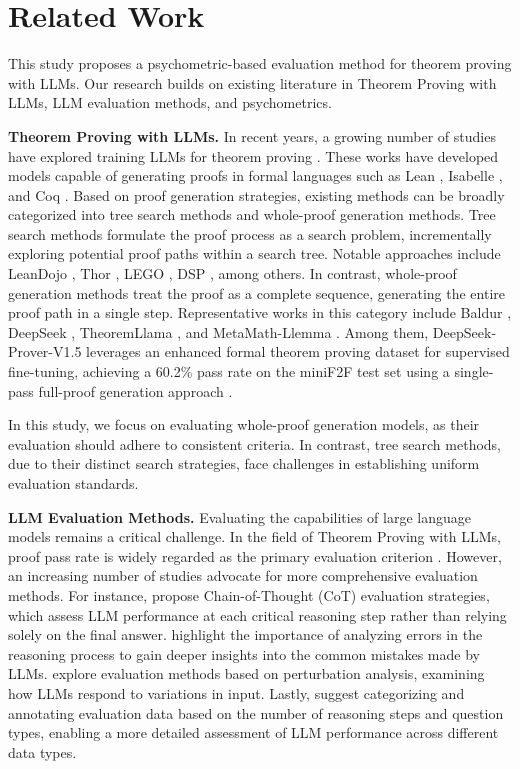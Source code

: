\section{Related Work}
\label{section-2}
This study proposes a psychometric-based evaluation method for theorem proving with LLMs. Our research builds on existing literature in Theorem Proving with LLMs, LLM evaluation methods, and psychometrics.

\textbf{Theorem Proving with LLMs.} In recent years, a growing number of studies have explored training LLMs for theorem proving \cite{yang2024formal}. These works have developed models capable of generating proofs in formal languages such as Lean \cite{moura2021lean}, Isabelle \cite{paulson1994isabelle}, and Coq \cite{huet1997coq}. Based on proof generation strategies, existing methods can be broadly categorized into tree search methods and whole-proof generation methods. Tree search methods formulate the proof process as a search problem, incrementally exploring potential proof paths within a search tree. Notable approaches include LeanDojo \cite{yang2024leandojo}, Thor \cite{jiang2022thor}, LEGO \cite{wang2023lego}, DSP \cite{jiang2022draft}, among others. In contrast, whole-proof generation methods treat the proof as a complete sequence, generating the entire proof path in a single step. Representative works in this category include Baldur \cite{first2023baldur}, DeepSeek \cite{xin2024deepseekproverv15harnessingproofassistant}, TheoremLlama \cite{wang2024theoremllama}, and MetaMath-Llemma \cite{yu2023metamath}. Among them, DeepSeek-Prover-V1.5 leverages an enhanced formal theorem proving dataset for supervised fine-tuning, achieving a 60.2\% pass rate on the miniF2F test set using a single-pass full-proof generation approach \cite{xin2024deepseekproverv15harnessingproofassistant}.

In this study, we focus on evaluating whole-proof generation models, as their evaluation should adhere to consistent criteria. In contrast, tree search methods, due to their distinct search strategies, face challenges in establishing uniform evaluation standards.

\textbf{LLM Evaluation Methods.} Evaluating the capabilities of large language models remains a critical challenge. In the field of Theorem Proving with LLMs, proof pass rate is widely regarded as the primary evaluation criterion \cite{xia2024evaluating}. However, an increasing number of studies advocate for more comprehensive evaluation methods. For instance, \cite{zhang2025mathverse, hao2024llm} propose Chain-of-Thought (CoT) evaluation strategies, which assess LLM performance at each critical reasoning step rather than relying solely on the final answer. \cite{shao2024empirical, jin2023cladder, orenes2023using} highlight the importance of analyzing errors in the reasoning process to gain deeper insights into the common mistakes made by LLMs. \cite{xia2024evaluating, hong2024stuck} explore evaluation methods based on perturbation analysis, examining how LLMs respond to variations in input. Lastly, \cite{srivastava2024evaluating} suggest categorizing and annotating evaluation data based on the number of reasoning steps and question types, enabling a more detailed assessment of LLM performance across different data types.

